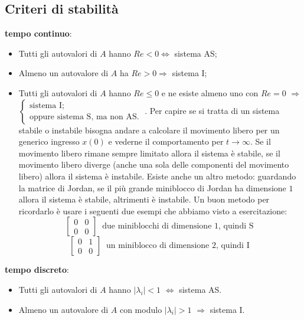 \begin{landscape}
\begin{multicols*}{3}
    \subsection{Criteri di stabilità}
    \textbf{tempo continuo}:
    \begin{itemize}
        \item Tutti gli autovalori di $A$ hanno $Re < 0 \Longleftrightarrow $ sistema AS;
        \item Almeno un autovalore di $A$ ha $Re > 0 \Longrightarrow$ sistema I;
        \item Tutti gli autovalori di $A$ hanno $Re \leq 0$ e ne esiste almeno uno con $Re = 0$ $\Longrightarrow$ $\begin{cases}
            \text{sistema I;}\;\\
            \text{oppure sistema S, ma non AS.}\;
        \end{cases}$. \newline
        Per capire se si tratta di un sistema stabile o instabile bisogna andare a calcolare il movimento libero per un generico ingresso $x(0)$ e vederne il comportamento per $t \rightarrow \infty$. Se il movimento libero rimane sempre limitato allora il sistema è stabile, se il movimento libero diverge (anche una sola delle componenti del movimento libero) allora il sistema è instabile. \newline
        Esiste anche un altro metodo: guardando la matrice di Jordan, se il più grande miniblocco di Jordan ha dimensione $1$ allora il sistema è stabile, altrimenti è instabile. Un buon metodo per ricordarlo è usare i seguenti due esempi che abbiamo visto a esercitazione:
        \[
            \left[\begin{matrix}
                0 & 0 \\
                0 & 0
            \end{matrix}\right] \;\;\text{due miniblocchi di dimensione 1, quindi S}\;
        \]
        \[
            \left[\begin{matrix}
                0&1\\
                0&0
            \end{matrix}\right] \;\; \text{un miniblocco di dimensione 2, quindi I}\;
        \]
    \end{itemize}
    \textbf{tempo discreto}:
    \begin{itemize}
        \item Tutti gli autovalori di $A$ hanno $|\lambda_i| < 1$ $\Longleftrightarrow$ sistema AS.
        \item Almeno un autovalore di $A$ con modulo $|\lambda_i| > 1$ $\Longrightarrow$ sistema I.

\end{itemize}
\end{multicols*}
\end{landscape}
